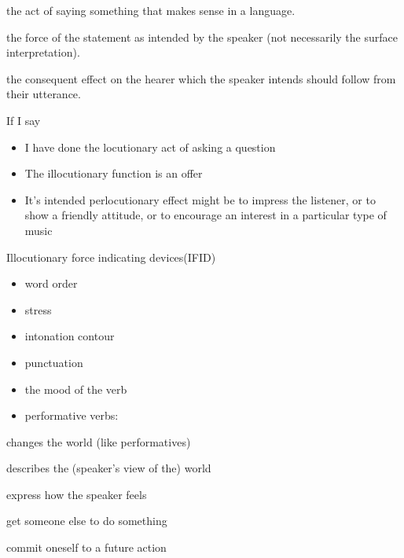 \documentclass[headrule,footrule]{foils}
\begin{document}
\begin{description}\addtolength{\itemsep}{-1.5ex}
\item {} the act of saying something that makes
  sense in a language.
\item {} the force of the statement
  as intended by the speaker (not necessarily the surface interpretation).
\item {} the consequent effect on the hearer which
  the speaker intends should follow from their utterance.
\end{description}
If I say 
\begin{itemize}\addtolength{\itemsep}{-1.5ex}
\item I have done the locutionary act of asking a question
\item The  illocutionary function is an offer
\item It's intended perlocutionary effect might be to impress the
  listener, or to show a friendly attitude, or to encourage an
  interest in a particular type of music
\end{itemize}



\newpage
Illocutionary force indicating devices(IFID)
\begin{itemize}
\item   word order
\item    stress
\item    intonation contour
\item    punctuation
\item    the mood of the verb
\item     performative verbs:  
\end{itemize}

  \begin{description}
  \item {} changes the world (like performatives)
  \item {} describes the (speaker's view of the) world 
  \item {}  express how the speaker feels
  \item {} get someone else to do something
  \item {} commit oneself to a future action
  \end{description}
\end{document}
